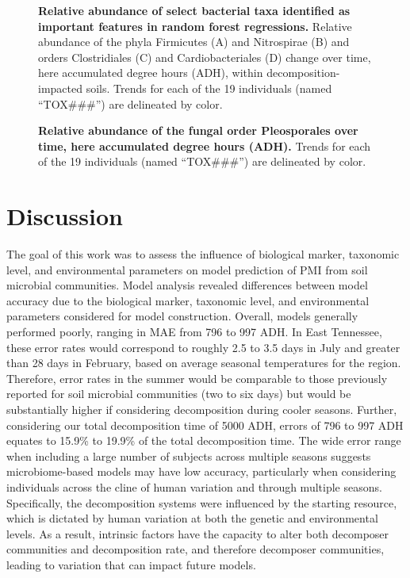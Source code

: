 \documentclass[
  10pt,
  letterpaper,
]{article}
\begin{document}
\begin{figure}[!h]
\caption{{\bf Relative abundance of select bacterial taxa identified as important features in random forest regressions.}
Relative abundance of the phyla Firmicutes (A) and Nitrospirae (B) and orders Clostridiales (C) and Cardiobacteriales (D) change over time, here accumulated degree hours (ADH), within decomposition-impacted soils. Trends for each of the 19 individuals (named “TOX\#\#\#”) are delineated by color.}
\label{fig6}
\end{figure}

\begin{figure}[!h]
\caption{{\bf Relative abundance of the fungal order Pleosporales over time, here accumulated degree hours (ADH).}
Trends for each of the 19 individuals (named “TOX\#\#\#”) are delineated by color.}
\label{fig7}
\end{figure}

\hypertarget{discussion}{%
\section{Discussion}\label{discussion}}

The goal of this work was to assess the influence of biological marker,
taxonomic level, and environmental parameters on model prediction of PMI
from soil microbial communities. Model analysis revealed differences
between model accuracy due to the biological marker, taxonomic level,
and environmental parameters considered for model construction. Overall,
models generally performed poorly, ranging in MAE from 796 to 997 ADH.
In East Tennessee, these error rates would correspond to roughly 2.5 to
3.5 days in July and greater than 28 days in February, based on average
seasonal temperatures for the region. Therefore, error rates in the
summer would be comparable to those previously reported for soil
microbial communities (two to six days) \citep{belk_microbiome_2018} but
would be substantially higher if considering decomposition during cooler
seasons. Further, considering our total decomposition time of 5000 ADH,
errors of 796 to 997 ADH equates to 15.9\% to 19.9\% of the total
decomposition time. The wide error range when including a large number
of subjects across multiple seasons suggests microbiome-based models may
have low accuracy, particularly when considering individuals across the
cline of human variation and through multiple seasons. Specifically, the
decomposition systems were influenced by the starting resource, which is
dictated by human variation at both the genetic and environmental
levels. As a result, intrinsic factors have the capacity to alter both
decomposer communities and decomposition rate, and therefore decomposer
communities, leading to variation that can impact future models.
\end{document}
